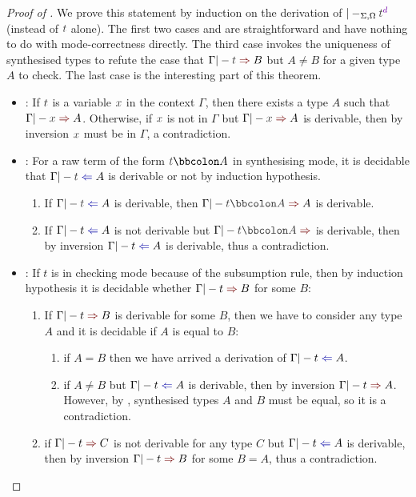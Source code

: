 \begin{proof}[Proof of {}]
  We prove this statement by induction on the derivation of $|-_{\Sigma, \Omega} \isTerm{t}^{\dir{d}}$ (instead of $\isTerm{t}$ alone).
  The first two cases  and  are straightforward and have nothing to do with mode-correctness directly.
  The third case  invokes the uniqueness of synthesised types to refute the case that $\Gamma |- \isTerm{t} \syn B$ but $A \neq B$ for a given type $A$ to check.
  The last case  is the interesting part of this theorem.
  \begin{itemize}
    \item {}: If $\isTerm{t}$ is a variable $\isTerm{x}$ in the context $\Gamma$, then there exists a type $A$ such that $\Gamma |- \isTerm{x} \syn A$.
      Otherwise, if $\isTerm{x}$ is not in $\Gamma$ but $\Gamma |- \isTerm{x} \syn A$ is derivable, then by inversion $\isTerm{x}$ must be in $\Gamma$, a contradiction.
    \item {}: For a raw term of the form $\isTerm{t} \annotate A$ in synthesising mode, it is decidable that $\Gamma |- \isTerm{t} \chk A$ is derivable or not by induction hypothesis.
      \begin{enumerate}
        \item If $\Gamma |- \isTerm{t} \chk A$ is derivable, then $\Gamma |- \isTerm{t \annotate A} \syn A$ is derivable.
        \item If $\Gamma |- t \chk A$ is not derivable but $\Gamma |- \isTerm{t \annotate A} \syn$ is derivable, then by inversion $\Gamma |- t \chk A$ is derivable, thus a contradiction.
      \end{enumerate}
      
    \item {}: If $t$ is in checking mode because of the subsumption rule, then by induction hypothesis it is decidable whether $\Gamma |- t \syn B$ for some $B$:
      \begin{enumerate}
        \item If $\Gamma |- t \syn B$ is derivable for some $B$, then we have to consider any type $A$ and it is decidable if $A$ is equal to $B$:
          \begin{enumerate}
            \item if $A = B$ then we have arrived a derivation of $\Gamma |- t \chk A$.
            \item if $A \neq B$ but $\Gamma |- t \chk A$ is derivable, then by inversion $\Gamma |- t \syn A$.
              However, by , synthesised types $A$ and $B$ must be equal, so it is a contradiction.
          \end{enumerate}
        \item if $\Gamma |- t \syn C$ is not derivable for any type $C$ but $\Gamma |- t \chk A$ is derivable, then by inversion $\Gamma |- t \syn B$ for some $B = A$, thus a contradiction.
      \end{enumerate}
      

\end{itemize}
\end{proof}
